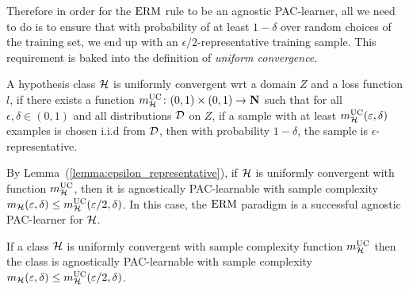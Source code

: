 Therefore in order for the $\operatorname{ERM}$ rule to be an agnostic PAC-learner, all we
need to do is to ensure that with probability of at least $1 - \delta$ over
random choices of the training set, we end up with an
$\epsilon/2$-representative training sample. This requirement is baked into
the definition of \emph{uniform convergence}.

\begin{definition}
A hypothesis class $\mathcal{H}$ is uniformly convergent wrt a domain $Z$
and a loss function $l$, if there exists a function
$m_{\mathcal{H}}^{\text{UC}} \colon (0, 1) \times (0, 1) \rightarrow \mathbf{N}$ such that
for all $\epsilon, \delta \in (0, 1)$ and all distributions $\mathcal{D}$ on $Z$,
if a sample with at least $m_{\mathcal{H}}^{\text{UC}}(\varepsilon, \delta)$ examples is chosen
i.i.d from $\mathcal{D}$, then with probability $1 - \delta$, the sample is
$\epsilon$-representative.
\end{definition}

By Lemma~(\ref{lemma:epsilon_representative}), if $\mathcal{H}$ is uniformly
convergent with function $m_{\mathcal{H}}^{\text{UC}}$, then it is agnostically PAC-learnable
with sample complexity $m_{\mathcal{H}}(\varepsilon, \delta) \leq
m_{\mathcal{H}}^{\text{UC}}(\varepsilon / 2, \delta)$. In this case, the $\operatorname{ERM}$ paradigm is a
successful agnostic PAC-learner for $\mathcal{H}$.
\begin{corollary}
If a class $\mathcal{H}$ is uniformly convergent with sample complexity function
$m_{\mathcal{H}}^{\text{UC}}$ then the class is agnostically PAC-learnable with sample complexity
$m_{\mathcal{H}}(\varepsilon, \delta) \leq m_{\mathcal{H}}^{\text{UC}}(\varepsilon / 2, \delta)$.
\end{corollary}

